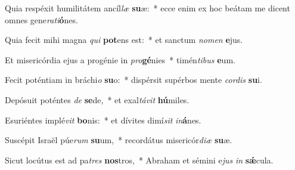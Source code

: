 \item Quia respéxit humilitátem ancíl\textit{læ} \textbf{su}æ:~* ecce enim ex hoc beátam me dicent omnes gene\textit{ra}\textit{ti}\textbf{ó}nes.
\item Quia fecit mihi magna \textit{qui} \textbf{pot}ens est:~* et sanctum \textit{no}\textit{men} \textbf{e}jus.
\item Et misericórdia ejus a progénie in \textit{pro}\textbf{gé}nies~* timén\textit{ti}\textit{bus} \textbf{e}um.
\item Fecit poténtiam in bráchi\textit{o} \textbf{su}o:~* dispérsit supérbos mente \textit{cor}\textit{dis} \textbf{su}i.
\item Depósuit poténtes \textit{de} \textbf{se}de,~* et exal\textit{tá}\textit{vit} \textbf{hú}miles.
\item Esuriéntes implé\textit{vit} \textbf{bo}nis:~* et dívites dimí\textit{sit} \textit{in}\textbf{á}nes.
\item Suscépit Israël púe\textit{rum} \textbf{su}um,~* recordátus misericór\textit{di}\textit{æ} \textbf{su}æ.
\item Sicut locútus est ad pa\textit{tres} \textbf{nos}tros,~* Abraham et sémini e\textit{jus} \textit{in} \textbf{sǽ}cula.
